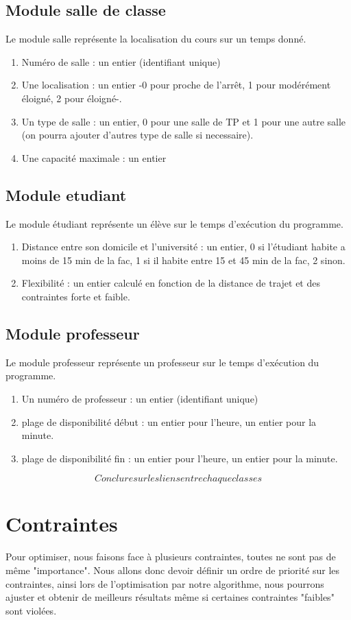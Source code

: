 \documentclass[a4paper,11pt]{article}
\begin{document}
	\subsection{Module salle de classe}
		Le module salle représente la localisation du cours sur un temps donné.
		\begin{enumerate}
			\item Numéro de salle : un entier (identifiant unique)
			\item Une localisation : un entier -0 pour proche de l'arrêt, 1 pour modérément éloigné, 2 pour éloigné-. 
			\item Un type de salle : un entier, 0 pour une salle de TP et 1 pour une autre salle (on pourra ajouter d'autres type de salle si necessaire).
			\item Une capacité maximale : un entier
		\end{enumerate}
	\subsection{Module etudiant}
		Le module étudiant représente un élève sur le temps d'exécution du programme.
		\begin{enumerate}
			\item Distance entre son domicile et l'université : un entier, 0 si l'étudiant habite a moins de 15 min de la fac, 1 si il habite entre 15 et 45 min de la fac, 2 sinon.
			\item Flexibilité : un entier calculé en fonction de la distance de trajet et des contraintes forte et faible. 
			\end{enumerate}
	\subsection{Module professeur}
		Le module professeur représente un professeur sur le temps d'exécution du programme.
		\begin{enumerate}
			\item Un numéro de professeur : un entier (identifiant unique)
			\item plage de disponibilité début : un entier pour l'heure, un entier pour la minute.
			\item plage de disponibilité fin : un entier pour l'heure, un entier pour la minute.
			\end{enumerate}
	$$Conclure sur les liens entre chaque classes$$
\section{Contraintes}
	Pour optimiser, nous faisons face à plusieurs contraintes, toutes ne sont pas 
	de même "importance". Nous allons donc devoir définir un ordre de priorité sur 
	les contraintes, ainsi lors de l'optimisation par notre algorithme, nous 
	pourrons ajuster et obtenir de meilleurs résultats même si certaines contraintes
	"faibles" sont violées.\\
\end{document}
